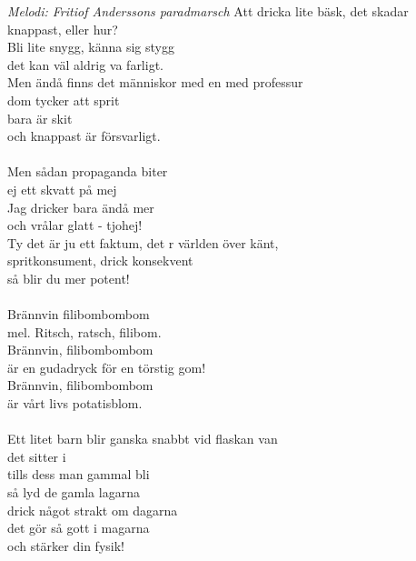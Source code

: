 {\footnotesize\textit{Melodi: Fritiof Anderssons paradmarsch}}
\vspace{10pt}
Att dricka lite bäsk, det skadar knappast, eller hur?\\
Bli lite snygg, känna sig stygg\\
det kan väl aldrig va farligt.\\
Men ändå finns det människor med en med professur\\
dom tycker att sprit\\
bara är skit\\
och knappast är försvarligt.\\
\\
Men sådan propaganda biter\\
ej ett skvatt på mej\\
Jag dricker bara ändå mer\\
och vrålar glatt - tjohej!\\
Ty det är ju ett faktum, det r världen över känt,\\
spritkonsument, drick konsekvent\\
så blir du mer potent!\\
\\
Brännvin filibombombom\\
mel. Ritsch, ratsch, filibom.\\
Brännvin, filibombombom\\
är en gudadryck för en törstig gom!\\
Brännvin, filibombombom\\
är vårt livs potatisblom.\\
\\
Ett litet barn blir ganska snabbt vid flaskan van\\
det sitter i\\
tills dess man gammal bli\\
så lyd de gamla lagarna\\
drick något strakt om dagarna\\
det gör så gott i magarna\\
och stärker din fysik!
